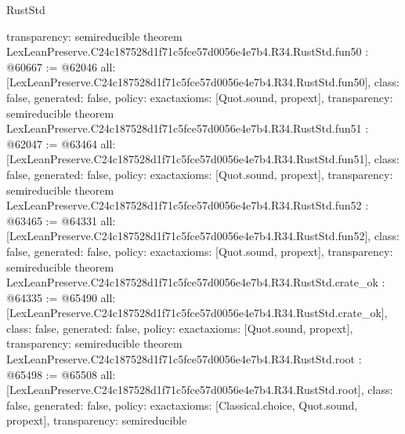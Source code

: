 \begin{lexlean}{RustStd}
\begin{coremodule}
{  transparency: semireducible
}
theorem LexLeanPreserve.C24c187528d1f71c5fce57d0056e4e7b4.R34.RustStd.fun50 : @60667 := @62046 {
  all: [LexLeanPreserve.C24c187528d1f71c5fce57d0056e4e7b4.R34.RustStd.fun50],
  class: false,
  generated: false,
  policy: exact{axioms: [Quot.sound, propext]},
  transparency: semireducible
}
theorem LexLeanPreserve.C24c187528d1f71c5fce57d0056e4e7b4.R34.RustStd.fun51 : @62047 := @63464 {
  all: [LexLeanPreserve.C24c187528d1f71c5fce57d0056e4e7b4.R34.RustStd.fun51],
  class: false,
  generated: false,
  policy: exact{axioms: [Quot.sound, propext]},
  transparency: semireducible
}
theorem LexLeanPreserve.C24c187528d1f71c5fce57d0056e4e7b4.R34.RustStd.fun52 : @63465 := @64331 {
  all: [LexLeanPreserve.C24c187528d1f71c5fce57d0056e4e7b4.R34.RustStd.fun52],
  class: false,
  generated: false,
  policy: exact{axioms: [Quot.sound, propext]},
  transparency: semireducible
}
theorem LexLeanPreserve.C24c187528d1f71c5fce57d0056e4e7b4.R34.RustStd.crate_ok : @64335 := @65490 {
  all: [LexLeanPreserve.C24c187528d1f71c5fce57d0056e4e7b4.R34.RustStd.crate_ok],
  class: false,
  generated: false,
  policy: exact{axioms: [Quot.sound, propext]},
  transparency: semireducible
}
theorem LexLeanPreserve.C24c187528d1f71c5fce57d0056e4e7b4.R34.RustStd.root : @65498 := @65508 {
  all: [LexLeanPreserve.C24c187528d1f71c5fce57d0056e4e7b4.R34.RustStd.root],
  class: false,
  generated: false,
  policy: exact{axioms: [Classical.choice, Quot.sound, propext]},
  transparency: semireducible
}


\end{coremodule}
\end{lexlean}
